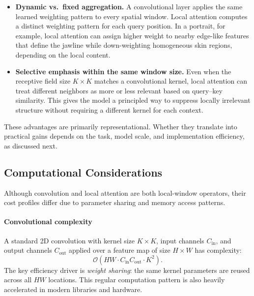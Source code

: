 \begin{itemize}
	\item \textbf{Dynamic vs.\ fixed aggregation.}
	A convolutional layer applies the same learned weighting pattern to every spatial window.
	Local attention computes a distinct weighting pattern for each query position.
	In a portrait, for example, local attention can assign higher weight to nearby edge-like features that define the jawline while down-weighting homogeneous skin regions, depending on the local content.
	
	\item \textbf{Selective emphasis within the same window size.}
	Even when the receptive field size \(K \times K\) matches a convolutional kernel, local attention can treat different neighbors as more or less relevant based on query--key similarity.
	This gives the model a principled way to suppress locally irrelevant structure without requiring a different kernel for each context.
\end{itemize}

\noindent
These advantages are primarily representational.
Whether they translate into practical gains depends on the task, model scale, and implementation efficiency, as discussed next.

\subsection{Computational Considerations}
\label{subsec:chapter18_local_attention_complexity}

\noindent
Although convolution and local attention are both local-window operators, their cost profiles differ due to parameter sharing and memory access patterns.

\paragraph{Convolutional complexity}
\noindent
A standard 2D convolution with kernel size \(K \times K\), input channels \(C_{\text{in}}\), and output channels \(C_{\text{out}}\) applied over a feature map of size \(H \times W\) has complexity:
\begin{equation}
	\mathcal{O}\!\left(
	H W \cdot C_{\text{in}} C_{\text{out}} \cdot K^2
	\right).
	\label{eq:chapter18_conv_complexity}
\end{equation}
The key efficiency driver is \emph{weight sharing}:
the same kernel parameters are reused across all \(HW\) locations.
This regular computation pattern is also heavily accelerated in modern libraries and hardware.

